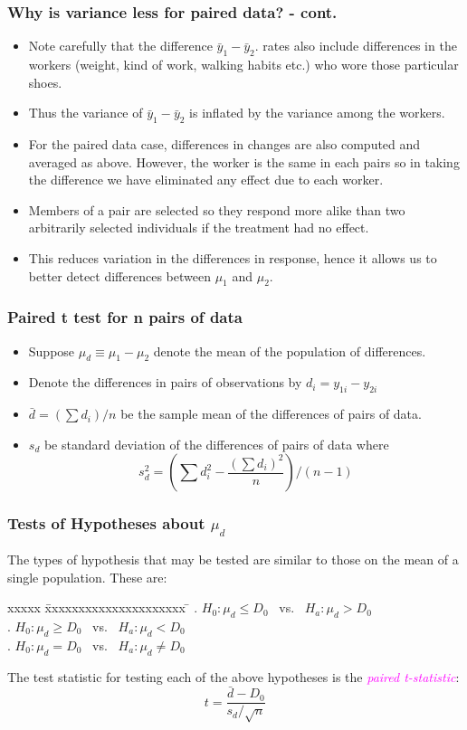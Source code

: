 \documentclass[xcolor=dvipsnames,12pt]{beamer}
\begin{document}
\begin{frame}
\frametitle{Why is variance less for paired data? - cont.}
\begin{itemize}
\item Note carefully that the  difference $\bar{y}_1 - \bar{y}_2$.
rates also include differences in the workers (weight, kind of work,
walking habits etc.) who wore those particular shoes.
\item Thus the variance of $\bar{y}_1 - \bar{y}_2$ is inflated by the 
variance among the workers.
\item For the paired data case, differences in changes are also computed
and averaged as above. However, the worker is the same in each  pairs
so in taking the difference we have eliminated any effect due to each worker.
\item Members of a pair are selected so they respond more alike than two arbitrarily
selected individuals if the treatment had no effect.
\item This reduces variation in the differences in response, hence it
allows us to better detect differences between $\mu_1$ and $\mu_2$.
\end{itemize}
\end{frame}


\begin{frame}
\frametitle{Paired t test for n pairs of data}
\begin{itemize}
\item Suppose $\mu_d\equiv \mu_1-\mu_2$ denote the mean of the population of 
differences. 
\item Denote the differences in pairs of observations by $d_i=y_{1i}-y_{2i}$

\item $\bar{d}=(\sum d_i)/n$ be the sample mean of the differences of pairs of data.

\item $s_d$  be standard deviation of the differences of pairs of data where
$$s_d^2 = \left(\sum{d_i^2} - \frac{(\sum{d_i})^2}{n}\right)/(n-1)$$
\end{itemize}
\end{frame}



\begin{frame}
\frametitle{Tests of Hypotheses about $\mu_d$}
 The types of hypothesis that may be tested are similar to those on the mean 
of a single population. These are:\\[.1in]
\begin{tabbing}
xxxxx \= xxxxxxxxxxxxxxxxxxxxx \=  \kill
{}. $H_0: \mu_d \leq D_0$ \ vs. \ $H_a: \mu_d > D_0$\\
. $H_0: \mu_d \geq D_0$ \ vs. \ $H_a: \mu_d < D_0$\\
. $H_0: \mu_d = D_0$    \ vs. \ $H_a: \mu_d \neq D_0 $ 
\end{tabbing}
The test statistic for testing each of the above hypotheses is the \textcolor{magenta}{\textit{paired t-statistic}}:
$$
  t = \frac{\bar{d}-D_0}{s_d/\sqrt{n}} 
$$
\end{frame}
\end{document}

